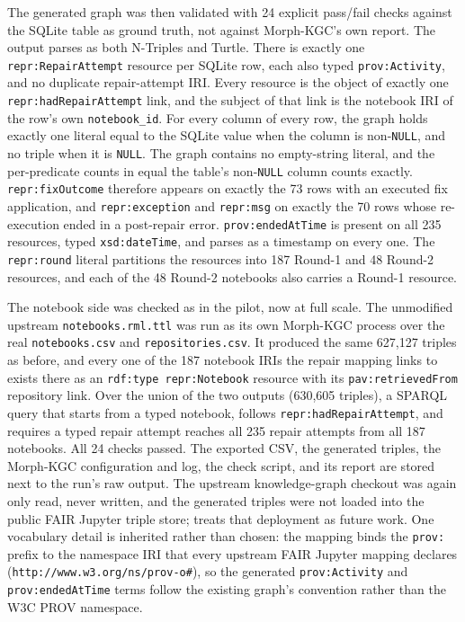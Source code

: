 \begin{sloppypar}
The generated graph was then validated with 24 explicit pass/fail checks
against the SQLite table as ground truth, not against Morph-KGC's own
report. The output parses as both N-Triples and Turtle. There is exactly
one \texttt{repr:RepairAttempt} resource per SQLite row, each also typed
\texttt{prov:Activity}, and no duplicate repair-attempt IRI. Every resource
is the object of exactly one \texttt{repr:hadRepairAttempt} link, and the
subject of that link is the notebook IRI of the row's own
\texttt{notebook\_id}. For every column of every row, the graph holds
exactly one literal equal to the SQLite value when the column is
non-\texttt{NULL}, and no triple when it is \texttt{NULL}. The graph
contains no empty-string literal, and the per-predicate counts in
 equal the table's non-\texttt{NULL} column
counts exactly. \texttt{repr:fixOutcome} therefore appears on exactly the
73 rows with an executed fix application, and \texttt{repr:exception} and
\texttt{repr:msg} on exactly the 70 rows whose re-execution ended in a
post-repair error. \texttt{prov:endedAtTime} is present on all 235
resources, typed \texttt{xsd:dateTime}, and parses as a timestamp on every
one. The \texttt{repr:round} literal partitions the resources into 187
Round-1 and 48 Round-2 resources, and each of the 48 Round-2 notebooks
also carries a Round-1 resource.
\end{sloppypar}

The notebook side was checked as in the pilot, now at full scale. The
unmodified upstream \texttt{notebooks.rml.ttl} was run as its own
Morph-KGC process over the real \texttt{notebooks.csv} and
\texttt{repositories.csv}. It produced the same 627{,}127 triples as
before, and every one of the 187 notebook IRIs the repair mapping links
to exists there as an \texttt{rdf:type repr:Notebook} resource with its
\texttt{pav:retrievedFrom} repository link. Over the union of the two
outputs (630{,}605 triples), a SPARQL query that starts from a typed
notebook, follows \texttt{repr:hadRepairAttempt}, and requires a typed
repair attempt reaches all 235 repair attempts from all 187 notebooks. All
24 checks passed. The exported CSV, the generated triples, the Morph-KGC
configuration and log, the check script, and its report are stored next
to the run's raw output. The upstream knowledge-graph checkout was again
only read, never written, and the generated triples were not loaded into
the public FAIR Jupyter triple store;  treats that
deployment as future work. One vocabulary detail is inherited rather than
chosen: the mapping binds the \texttt{prov:} prefix to the namespace IRI
that every upstream FAIR Jupyter mapping declares
(\texttt{http://www.w3.org/ns/prov-o\#}), so the generated
\texttt{prov:Activity} and \texttt{prov:endedAtTime} terms follow the
existing graph's convention rather than the W3C PROV namespace.

